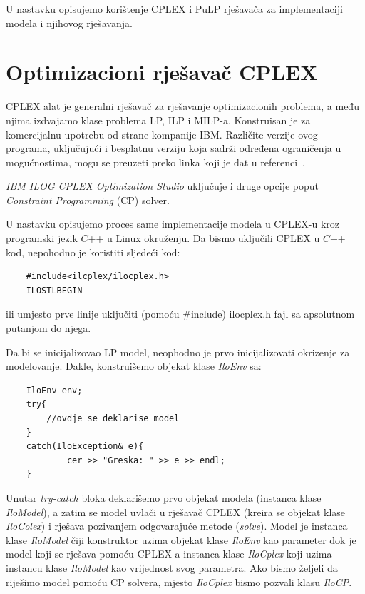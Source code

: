 \documentclass[a4paper, utf8, 11pt, colorlinks]{book}
\theoremstyle{definition}
\begin{document}
 U nastavku opisujemo korištenje CPLEX i PuLP rješavača za implementaciji modela i njihovog rješavanja. 
 
 \section{Optimizacioni rješavač CPLEX}
 CPLEX alat je generalni rješavač za rješavanje optimizacionih problema, a među njima izdvajamo klase problema LP, ILP i MILP-a. Konstruisan je za komercijalnu upotrebu od strane kompanije IBM. Različite verzije ovog programa, uključujući i besplatnu verziju koja sadrži određena ograničenja u mogućnostima, mogu se preuzeti preko linka koji je dat u referenci~\cite{cite_key24}. 
 
\emph{IBM ILOG CPLEX Optimization Studio} uključuje i druge opcije poput \emph{Constraint Programming} (CP) solver.
 
 U nastavku opisujemo proces same implementacije modela u CPLEX-u kroz programski jezik $C$++ u Linux okruženju.
 Da bismo uključili CPLEX u $C$++ kod, nepohodno je koristiti sljedeći kod:
 \begin{verbatim}
 	#include<ilcplex/ilocplex.h>
 	ILOSTLBEGIN
 \end{verbatim}
ili umjesto prve linije uključiti (pomoću \#include) ilocplex.h fajl sa apsolutnom putanjom do njega. 

 Da bi se inicijalizovao LP model, neophodno je prvo inicijalizovati okrizenje za modelovanje. Dakle, konstruišemo objekat klase \emph{IloEnv} sa: 
 \begin{verbatim}
 	IloEnv env;
 	try{
 		//ovdje se deklarise model
 	}
 	catch(IloException& e){
 		    cer >> "Greska: " >> e >> endl;
 	}
 \end{verbatim}
 
 \noindent Unutar \emph{try-catch} bloka deklarišemo prvo objekat modela (instanca klase \emph{IloModel}), a zatim se model uvlači u rješavač CPLEX (kreira se objekat klase \emph{IloColex}) i rješava pozivanjem odgovarajuće metode (\emph{solve}).
 Model je instanca klase \emph{IloModel} čiji konstruktor uzima objekat klase \emph{IloEnv} kao parameter dok je model koji se rješava pomoću CPLEX-a instanca klase \emph{IloCplex} koji uzima instancu klase \emph{IloModel} kao vrijednost svog parametra.  Ako bismo željeli da riješimo model pomoću CP solvera, mjesto \emph{IloCplex} bismo pozvali klasu \emph{IloCP}. 
 
\end{document}
